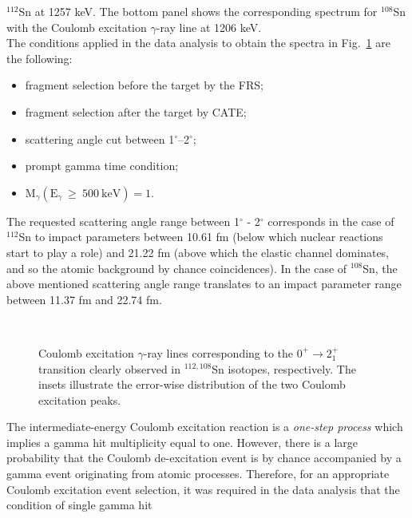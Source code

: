 \documentclass[aps,prc,twocolumn,amssymb,showpacs]{revtex4}
\begin{document}
$^{112}$Sn at 1257 keV. The bottom panel shows the corresponding
spectrum for $^{108}$Sn with the Coulomb excitation
$\gamma$-ray line at 1206 keV.\\
The conditions applied in the data analysis to obtain the spectra
in Fig.~\ref{fig:Sn_peaks} are the following:
\begin{itemize}
\item fragment selection before the target by the FRS; \item
fragment selection after the target by CATE; \item scattering
angle cut between 1$^{\circ}$--2$^{\circ}$; \item prompt gamma
time condition; \item $\text{M}_{\gamma}(\text{E}_{\gamma}\ \ge\
500\ \text{keV}) = 1$.
\end{itemize}
The requested scattering angle range between 1$^{\circ}$ -
2$^{\circ}$ corresponds in the case of $^{112}$Sn to impact
parameters between 10.61 fm (below which nuclear reactions start
to play a role) and 21.22 fm (above which the elastic channel
dominates, and so the atomic background by chance coincidences).
In the case of $^{108}$Sn, the above mentioned scattering angle
range translates to an impact parameter range between 11.37 fm and
22.74 fm.\\
\begin{figure}[!h]%
\centering
\subfigure{%
\resizebox{0.42\textwidth}{!}{%
\texttt{[image: 112Sn\_coulex.eps]}}}\\
\vspace{-5pt}
\subfigure{%
\resizebox{0.42\textwidth}{!}{%
\texttt{[image: 108Sn\_coulex.eps]}}}%
\vspace{5pt} \caption[Coulomb excitations $\gamma$-ray lines
observed in $^{112,108}$Sn]{\small Coulomb excitation $\gamma$-ray
lines corresponding to the $0^+ \rightarrow 2^+_1$ transition
clearly observed in $^{112,108}$Sn isotopes, respectively. The
insets illustrate the error-wise distribution of the two Coulomb excitation peaks.}%
\label{fig:Sn_peaks}%
\end{figure}The intermediate-energy Coulomb excitation reaction is a
\textit{one-step process} which implies a gamma hit multiplicity
equal to one. However, there is a large probability that the
Coulomb de-excitation event is by chance accompanied by a gamma
event originating from atomic processes. Therefore, for an
appropriate Coulomb excitation event selection, it was required in
the data analysis that the condition of single gamma hit
\end{document}
